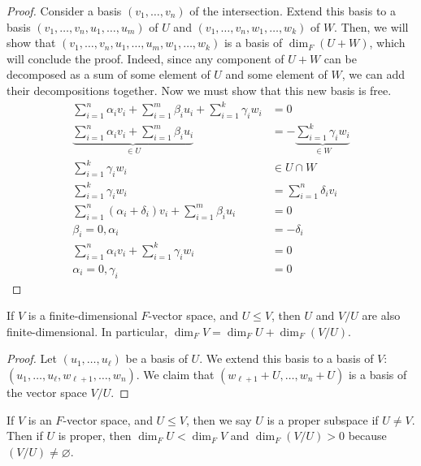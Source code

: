 \begin{proof}
    Consider a basis $(v_1, \dots, v_n)$ of the intersection.
    Extend this basis to a basis $(v_1, \dots, v_n, u_1, \dots, u_m)$ of $U$ and $(v_1, \dots, v_n, w_1, \dots, w_k)$ of $W$.
    Then, we will show that $(v_1, \dots, v_n, u_1, \dots, u_m, w_1, \dots, w_k)$ is a basis of $\dim_F (U + W)$, which will conclude the proof.
    Indeed, since any component of $U + W$ can be decomposed as a sum of some element of $U$ and some element of $W$, we can add their decompositions together.
    Now we must show that this new basis is free.
    \begin{align*}
        \sum_{i=1}^n \alpha_i v_i + \sum_{i=1}^m \beta_i u_i + \sum_{i=1}^k \gamma_i w_i & = 0 \\
        \underbrace{\sum_{i=1}^n \alpha_i v_i + \sum_{i=1}^m \beta_i u_i}_{\in U} &= -\underbrace{\sum_{i=1}^k \gamma_i w_i}_{\in W} \\
        \sum_{i=1}^k \gamma_i w_i &\in U \cap W \\
        \sum_{i=1}^k \gamma_i w_i &= \sum_{i=1}^n \delta_i v_i \\
        \sum_{i=1}^n (\alpha_i + \delta_i) v_i + \sum_{i=1}^m \beta_i u_i &= 0 \\
        \beta_i = 0, \alpha_i &= -\delta_i \\
        \sum_{i=1}^n \alpha_i v_i + \sum_{i=1}^k \gamma_i w_i &= 0 \\
        \alpha_i = 0, \gamma_i &= 0
    \end{align*}
\end{proof}

\begin{proposition} \label{prp:quotientdim}
    If $V$ is a finite-dimensional $F$-vector space, and $U \leq V$, then $U$ and $V / U$ are also finite-dimensional.
    In particular, $\dim_F V = \dim_F U + \dim_F (V / U)$.
\end{proposition}

\begin{proof}
    Let $(u_1, \dots, u_\ell)$ be a basis of $U$.
    We extend this basis to a basis of $V$: $(u_1, \dots, u_\ell, w_{\ell + 1}, \dots, w_n)$.
    We claim that $(w_{\ell + 1} + U, \dots, w_n + U)$ is a basis of the vector space $V / U$.
\end{proof}

\begin{remark}
    If $V$ is an $F$-vector space, and $U \leq V$, then we say $U$ is a proper subspace if $U \neq V$.
    Then if $U$ is proper, then $\dim_F U < \dim_F V$ and $\dim_F ( V / U ) > 0$ because $(V/U) \neq \varnothing$.
\end{remark}

